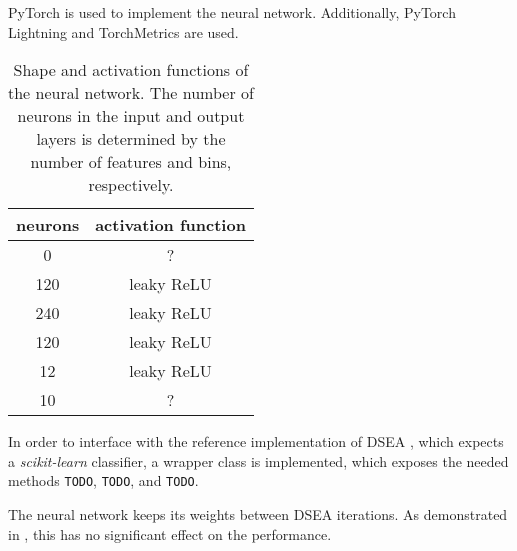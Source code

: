 PyTorch \cite{pytorch} is used to implement the neural network.
Additionally, PyTorch Lightning \cite{pytorch_lightning} and TorchMetrics \cite{torch_metrics} are used.

\begin{table}
  \centering
  \caption{
    Shape and activation functions of the neural network.
    The number of neurons in the input and output layers is determined by the number of features and bins, respectively.
  }
  \label{tab:nn_shape}
  \begin{tabular}{S[table-format=4.0] c}
    \toprule
    {neurons} & {activation function} \\
       & ? \\ %
    120 & leaky ReLU \\
    240 & leaky ReLU \\
    120 & leaky ReLU \\
    12  & leaky ReLU \\
    10  & ? \\
    \bottomrule
  \end{tabular}
\end{table}


In order to interface with the reference implementation of DSEA \cite{dsea_python},
  which expects a \emph{scikit-learn} \cite{sklearn} classifier,
a wrapper class is implemented,
  which exposes the needed methods
  \texttt{TODO}, \texttt{TODO}, and \texttt{TODO}.

The neural network keeps its weights between DSEA iterations.
As demonstrated in \cite{dsea_samuel}, %
this has no significant effect on the performance.
